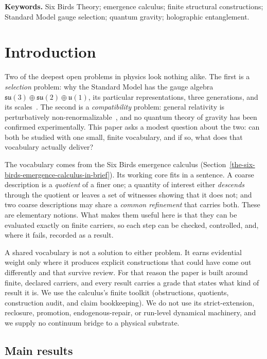 \documentclass[11pt]{article}
\theoremstyle{definition}
\begin{document}
\noindent\textbf{Keywords.} Six Birds Theory; emergence calculus; finite structural constructions; Standard Model gauge selection; quantum gravity; holographic entanglement.

\section{Introduction}\label{introduction}

Two of the deepest open problems in physics look nothing alike. The first is a \emph{selection} problem: why the
Standard Model has the gauge algebra \(\mathfrak{su}(3)\oplus\mathfrak{su}(2)\oplus\mathfrak{u}(1)\), its particular
representations, three generations, and its scales~\citep{Weinberg1967}. The second is a \emph{compatibility}
problem: general relativity is perturbatively non-renormalizable~\citep{tHooftVeltman1974,GoroffSagnotti1985}, and
no quantum theory of gravity has been confirmed experimentally. This paper asks a modest question about the two: can
both be studied with one small, finite vocabulary, and if so, what does that vocabulary actually deliver?

The vocabulary comes from the Six Birds emergence calculus (Section~\ref{the-six-birds-emergence-calculus-in-brief}).
Its working core fits in a sentence. A coarse description is a \emph{quotient} of a finer one; a quantity of interest
either \emph{descends} through the quotient or leaves a set of
witnesses showing that it does not; and two
coarse descriptions may share a \emph{common refinement} that carries both. These are elementary notions. What makes
them useful here is that they can be evaluated exactly on finite carriers, so each step can be checked, controlled,
and, where it fails, recorded as a result.

A shared vocabulary is not a solution to either problem. It earns evidential weight only where it produces explicit
constructions that could have come out differently and that survive review. For that reason the paper is built
around finite, declared carriers, and every result carries a grade that states what kind of result it is. We use
the calculus's finite toolkit (obstructions, quotients, construction audit, and claim bookkeeping). We do not use its
strict-extension, reclosure, promotion, endogenous-repair, or run-level dynamical machinery, and we supply no
continuum bridge to a physical substrate.

\subsection*{Main results}
\end{document}
